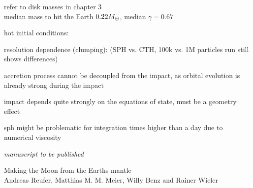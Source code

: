 refer to disk masses in chapter 3\\


\cite{Chambers:2001p2105}
median mass to hit the Earth $0.22 M_{\oplus}$, median $\gamma = 0.67$



hot initial conditions:
\citep{2000orem.book..179P}

resolution dependence (clumping):
\citep{Canup:2010p3713} (SPH vs. CTH, 100k vs. 1M particles run still shows differences)

accretion process cannot be decoupled from the impact, as orbital evolution is already strong during the impact 

impact depends quite strongly on the equations of state, must be a geometry effect

sph might be problematic for integration times higher than a day due to numerical viscosity \citep{Canup:2004p115} 






\clearpage
\thispagestyle{empty}
\begin{flushright} \emph{manuscript to be published} \end{flushright}
{\Large Making the Moon from the Earths mantle} \vspace{0.5cm}\\
Andreas Reufer, Matthias M. M. Meier, Willy Benz and Rainer Wieler\\

